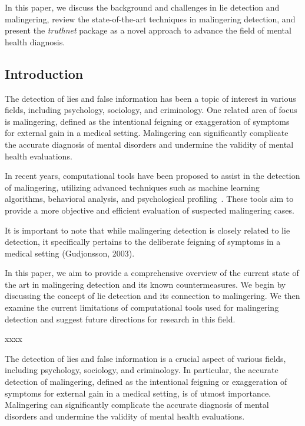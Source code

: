 \documentclass[onecolumn, compsoc,10pt]{IEEEtran}
\begin{document}
In this paper, we discuss the background and challenges in lie detection and malingering, review the state-of-the-art techniques in malingering detection, and present the \textit{truthnet} package as a novel approach to advance the field of mental health diagnosis.

\clearpage


\subsection*{Introduction}


The detection of lies and false information has been a topic of interest in various fields, including psychology, sociology, and criminology. One related area of focus is malingering, defined as the intentional feigning or exaggeration of symptoms for external gain in a medical setting. Malingering can significantly complicate the accurate diagnosis of mental disorders and undermine the validity of mental health evaluations.

In recent years, computational tools have been proposed to assist in the detection of malingering, utilizing advanced techniques such as machine learning algorithms, behavioral analysis, and psychological profiling~\cite{rogers2008clinical}. These tools aim to provide a more objective and efficient evaluation of suspected malingering cases.

It is important to note that while malingering detection is closely related to lie detection, it specifically pertains to the deliberate feigning of symptoms in a medical setting (Gudjonsson, 2003).

In this paper, we aim to provide a comprehensive overview of the current state of the art in malingering detection and its known countermeasures. We begin by discussing the concept of lie detection and its connection to malingering. We then examine the current limitations of computational tools used for malingering detection and suggest future directions for research in this field.


xxxx




The detection of lies and false information is a crucial aspect of various fields, including psychology, sociology, and criminology. In particular, the accurate detection of malingering, defined as the intentional feigning or exaggeration of symptoms for external gain in a medical setting, is of utmost importance. Malingering can significantly complicate the accurate diagnosis of mental disorders and undermine the validity of mental health evaluations.
\end{document}
